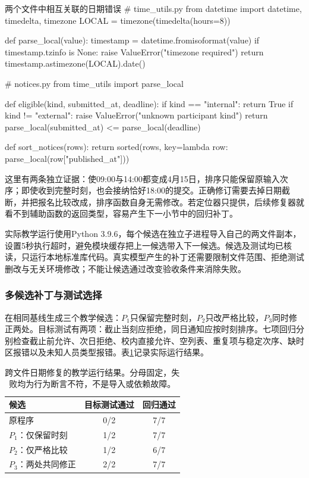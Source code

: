 \begin{codeblock}[language=Python,label={code:nlp-execution-repair-base}]{两个文件中相互关联的日期错误}
# time_utils.py
from datetime import datetime, timedelta, timezone
LOCAL = timezone(timedelta(hours=8))

def parse_local(value):
    timestamp = datetime.fromisoformat(value)
    if timestamp.tzinfo is None:
        raise ValueError("timezone required")
    return timestamp.astimezone(LOCAL).date()

# notices.py
from time_utils import parse_local

def eligible(kind, submitted_at, deadline):
    if kind == "internal":
        return True
    if kind != "external":
        raise ValueError("unknown participant kind")
    return parse_local(submitted_at) <= parse_local(deadline)

def sort_notices(rows):
    return sorted(rows,
                  key=lambda row: parse_local(row["published_at"]))
\end{codeblock}

这里有两条独立证据：使09:00与14:00都变成4月15日，排序只能保留原输入次序；\code{<=}即使收到完整时刻，也会接纳恰好18:00的提交。正确修订需要去掉日期截断，并把报名比较改成\code{<}，排序函数自身无需修改。若定位器只提供，后续修复器就看不到辅助函数的返回类型，容易产生下一小节中的回归补丁。

实际教学运行使用Python 3.9.6，每个候选在独立子进程导入自己的两文件副本，设置5秒执行超时，避免模块缓存把上一候选带入下一候选。候选及测试均已核读，只运行本地标准库代码。真实模型产生的补丁还需要限制文件范围、拒绝测试删改与无关环境修改；不能让候选通过改变验收条件来消除失败。

\subsubsection{多候选补丁与测试选择}
\label{sec:nlp-execution-patch-selection}

在相同基线生成三个教学候选：$P_1$只保留完整时刻，$P_2$只改严格比较，$P_3$同时修正两处。目标测试有两项：截止当刻应拒绝，同日通知应按时刻排序。七项回归分别检查截止前允许、次日拒绝、校内直接允许、空列表、重复项与稳定次序、缺时区报错以及未知人员类型报错。表\ref{tab:nlp-execution-patches}记录实际运行结果。

\begin{table}[htbp]
  \centering
  \begin{tabular}{lcc}
    \toprule
    候选 & 目标测试通过 & 回归通过 \\
    \midrule
    原程序 & 0/2 & 7/7 \\
    $P_1$：仅保留时刻 & 1/2 & 7/7 \\
    $P_2$：仅严格比较 & 1/2 & 6/7 \\
    $P_3$：两处共同修正 & 2/2 & 7/7 \\
    \bottomrule
  \end{tabular}
  \caption{跨文件日期修复的教学运行结果。分母固定，失败均为行为断言不符，不是导入或依赖故障。}
  \label{tab:nlp-execution-patches}
\end{table}
\FloatBarrier

